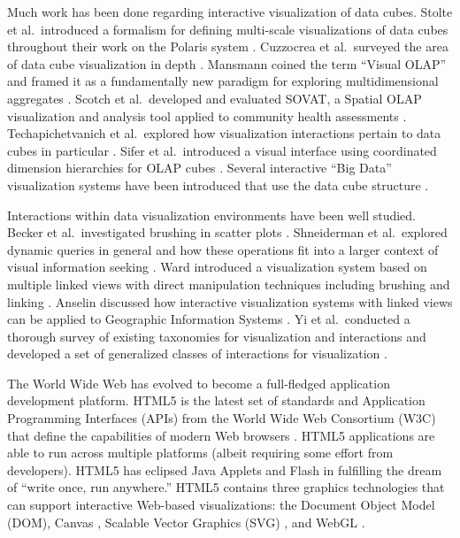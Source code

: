 Much work has been done regarding interactive visualization of data cubes. Stolte et al.\ introduced a formalism for defining multi-scale visualizations of data cubes throughout their work on the Polaris system \cite{stolte2003multiscale} \cite{stolte2002query} \cite{stolte2002polaris}. Cuzzocrea et al.\ surveyed the area of data cube visualization in depth \cite{cuzzocrea2009olap}. Mansmann coined the term ``Visual OLAP'' and framed it as a fundamentally new paradigm for exploring multidimensional aggregates \cite{mansmann2008visual}. Scotch et al.\ developed and evaluated SOVAT, a Spatial OLAP visualization and analysis tool applied to community health assessments \cite{scotch2005sovat} \cite{scotch2007usability}. Techapichetvanich et al.\ explored how visualization interactions pertain to data cubes in particular \cite{techapichetvanich2005interactive}. Sifer et al.\ introduced a visual interface using coordinated dimension hierarchies for OLAP cubes \cite{sifer2003visual}. Several interactive ``Big Data'' visualization systems have been introduced that use the data cube structure \cite{lins2013nanocubes} \cite{liu2013immens}. 

Interactions within data visualization environments have been well studied. Becker et al.\ investigated brushing in scatter plots \cite{becker1987brushing}. Shneiderman et al.\ explored dynamic queries in general and how these operations fit into a larger context of visual information seeking \cite{shneiderman1994dynamic}. Ward introduced a visualization system based on multiple linked views with direct manipulation techniques including brushing and linking \cite{ward1994xmdvtool}. Anselin discussed how interactive visualization systems with linked views can be applied to Geographic Information Systems \cite{anselin1999interactive}. Yi et al.\ conducted a thorough survey of existing taxonomies for visualization and interactions and developed a set of generalized classes of interactions for visualization \cite{yi2007toward}. 

The World Wide Web has evolved to become a full-fledged application development platform. HTML5 is the latest set of standards and Application Programming Interfaces (APIs) from the World Wide Web Consortium (W3C) that define the capabilities of modern Web browsers \cite{html5}. HTML5 applications are able to run across multiple platforms (albeit requiring some effort from developers). HTML5 has eclipsed Java Applets and Flash in fulfilling the dream of ``write once, run anywhere.'' HTML5 contains three graphics technologies that can support interactive Web-based visualizations: the Document Object Model (DOM), Canvas \cite{fulton2013html5}, Scalable Vector Graphics (SVG) \cite{svg}, and WebGL \cite{matsuda2013webgl}.

